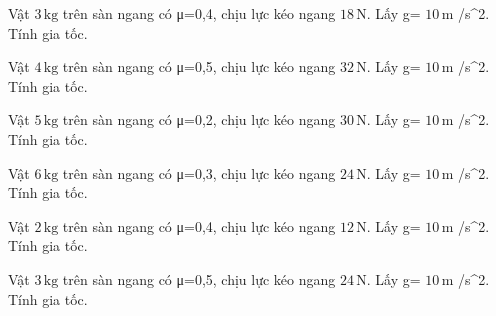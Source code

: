 \begin{ex}
Vật $3\,\text{kg}$ trên sàn ngang có μ=0,4, chịu lực kéo ngang $18\,\text{N}$. Lấy g= $10\,\text{m}$ /s^2. Tính gia tốc.
\end{ex}

\begin{ex}
Vật $4\,\text{kg}$ trên sàn ngang có μ=0,5, chịu lực kéo ngang $32\,\text{N}$. Lấy g= $10\,\text{m}$ /s^2. Tính gia tốc.
\end{ex}

\begin{ex}
Vật $5\,\text{kg}$ trên sàn ngang có μ=0,2, chịu lực kéo ngang $30\,\text{N}$. Lấy g= $10\,\text{m}$ /s^2. Tính gia tốc.
\end{ex}

\begin{ex}
Vật $6\,\text{kg}$ trên sàn ngang có μ=0,3, chịu lực kéo ngang $24\,\text{N}$. Lấy g= $10\,\text{m}$ /s^2. Tính gia tốc.
\end{ex}

\begin{ex}
Vật $2\,\text{kg}$ trên sàn ngang có μ=0,4, chịu lực kéo ngang $12\,\text{N}$. Lấy g= $10\,\text{m}$ /s^2. Tính gia tốc.
\end{ex}

\begin{ex}
Vật $3\,\text{kg}$ trên sàn ngang có μ=0,5, chịu lực kéo ngang $24\,\text{N}$. Lấy g= $10\,\text{m}$ /s^2. Tính gia tốc.
\end{ex}

